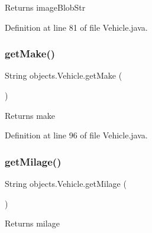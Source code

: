 \begin{DoxyReturn}{Returns}
image\+Blob\+Str 
\end{DoxyReturn}


Definition at line 81 of file Vehicle.\+java.


\begin{DoxyCode}{0}

\end{DoxyCode}
\mbox{\label{classobjects_1_1_vehicle_ada48ea9bb07ac065b9a4a0266f07e576}} 
\subsubsection{\texorpdfstring{getMake()}{getMake()}}
{\footnotesize\ttfamily String objects.\+Vehicle.\+get\+Make (\begin{DoxyParamCaption}{ }\end{DoxyParamCaption})}

\begin{DoxyReturn}{Returns}
make 
\end{DoxyReturn}


Definition at line 96 of file Vehicle.\+java.


\begin{DoxyCode}{0}

\end{DoxyCode}
\mbox{\label{classobjects_1_1_vehicle_aef0a9472bab0331015a34cf9b80c03d9}} 
\subsubsection{\texorpdfstring{getMilage()}{getMilage()}}
{\footnotesize\ttfamily String objects.\+Vehicle.\+get\+Milage (\begin{DoxyParamCaption}{ }\end{DoxyParamCaption})}

\begin{DoxyReturn}{Returns}
milage 
\end{DoxyReturn}


